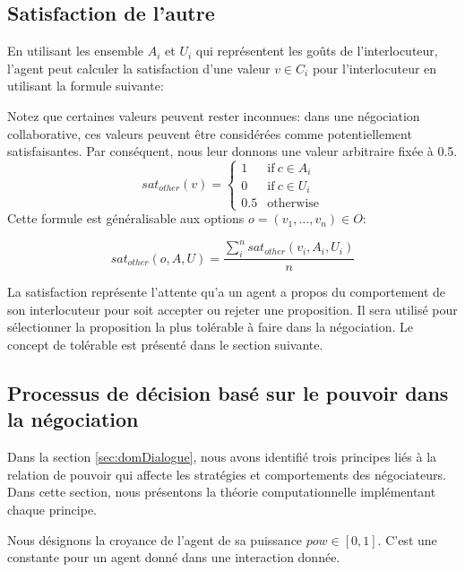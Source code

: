 \documentclass [french]{sig-alternate-05-2015}
\begin{document}
			
			\subsection{Satisfaction de l'autre}
				En utilisant les ensemble $A_i$ et $U_i$ qui représentent les goûts de l'interlocuteur, l'agent peut calculer la satisfaction d'une valeur $v\in C_i$ pour l'interlocuteur en utilisant la formule suivante: 
				
				Notez que certaines valeurs peuvent rester inconnues: dans une négociation collaborative, ces valeurs peuvent être considérées comme potentiellement satisfaisantes. Par conséquent, nous leur donnons une valeur arbitraire fixée à 0.5.
					\begin{equation}
					sat_{other}(v)= \left\{\begin{array}{ll}
					1	 & \mathrm{if\ }  c \in A_i\\
					0    & \mathrm{if\ }c \in U_i\\
					0.5	 & \mathrm{otherwise}
					\end{array}\right.
					\end{equation}
				Cette formule est généralisable aux options $o=(v_1,\ldots,v_n) \in O$:
				
				\begin{equation}
				sat_{other}(o, A, U) = \frac{ \sum_{i}^{n} sat_{other}(v_i, A_i, U_i) } {n}
				\end{equation}
			
			La satisfaction représente l'attente qu'a un agent a propos du comportement de son interlocuteur pour soit accepter ou rejeter une proposition. Il sera utilisé pour sélectionner la proposition la plus tolérable à faire dans la négociation. Le concept de tolérable est présenté dans le section suivante.	
			
			
			\subsection{Processus de décision basé sur le pouvoir dans la négociation}
			\label{sec:decision}
			Dans la section \ref{sec:domDialogue}, nous avons identifié trois principes liés à la relation de pouvoir qui affecte les stratégies et comportements des négociateurs. Dans cette section, nous présentons la théorie computationnelle implémentant chaque principe.
			
			Nous désignons la croyance de l'agent de sa puissance $ pow \in [0, 1] $. C'est une constante pour un agent donné dans une interaction donnée.
			
\end{document}
